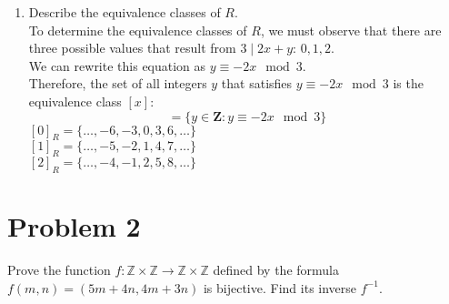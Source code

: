 \documentclass{article}
\begin{document}
\begin{enumerate}[label=\alph*.]
\begin{proof}
\begin{align*}
                    & = 3b - 2(3a - 2x) \\
                    & = 3b - 6a + 4x    \\
              \end{align*}
              Plugging this in to \(2x + z\) we get
              \begin{align*}
                  2x + z & = 2x + 3b - 6a + 4x                 \\
                         & = 6x + 3b - 6a                      \\
                         & = 3(2x + b - 2a)                    \\
                         & = 3c \text{ where } c = 2x + b - 2a
              \end{align*}
              Therefore by definition of divisibility, \(3 \mid (2x + z)\)
          \end{proof}
    \item Describe the equivalence classes of \(R\). \\
          To determine the equivalence classes of \(R\), we must observe that there are three possible values that result from \(3 \mid 2x + y\): \(0, 1, 2\). \\
          We can rewrite this equation as \(y \equiv -2x \mod 3\). \\
          Therefore, the set of all integers \(y\) that satisfies \(y \equiv -2x \mod 3\) is the equivalence class \([x]\): \\
          \begin{equation*}
              [x] = \{y \in \mathbf{Z} : y \equiv -2x \mod 3\}
          \end{equation*}
          \([0]_R = \{\dots, -6, -3, 0, 3, 6, \dots\}\) \\
          \([1]_R = \{\dots, -5, -2, 1, 4, 7, \dots\}\) \\
          \([2]_R = \{\dots, -4, -1, 2, 5, 8, \dots\}\) \\
\end{enumerate}

\pagebreak

\section*{Problem 2}
Prove the function \(f:\mathbb{Z} \times \mathbb{Z} \rightarrow \mathbb{Z} \times \mathbb{Z}\) defined by the formula \(f(m, n) = (5m + 4n, 4m + 3n)\) is bijective. Find its inverse \(f^{-1}\).
\end{document}
